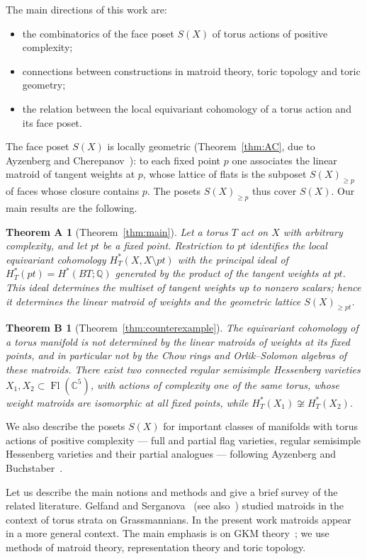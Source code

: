 \documentclass[11pt,a4paper]{article}
\numberwithin{equation}{section}
\theoremstyle{plain}
\newtheorem*{theoremA}{Theorem A}
\newtheorem*{theoremB}{Theorem B}
\theoremstyle{definition}
\theoremstyle{remark}
\newcommand{\Q}{\mathbb{Q}}
\newcommand{\C}{\mathbb{C}}
\newcommand{\HT}{H^{*}_{T}}
\DeclareMathOperator{\Fl}{Fl}
\begin{document}
The main directions of this work are:
\begin{itemize}[nosep]
\item the combinatorics of the face poset $S(X)$ of torus actions of positive complexity;
\item connections between constructions in matroid theory, toric topology and toric geometry;
\item the relation between the local equivariant cohomology of a torus action and its face poset.
\end{itemize}

The face poset $S(X)$ is locally geometric (Theorem~\ref{thm:AC}, due to Ayzenberg and Cherepanov~\cite{AC22}): to each fixed point $p$ one associates the linear matroid of tangent weights at $p$, whose lattice of flats is the subposet $S(X)_{\geqslant p}$ of faces whose closure contains $p$. The posets $S(X)_{\geqslant p}$ thus cover $S(X)$. Our main results are the following.

\begin{theoremA}[Theorem~\ref{thm:main}]
Let a torus $T$ act on $X$ with arbitrary complexity, and let $pt$ be a fixed point. Restriction to $pt$ identifies the local equivariant cohomology $\HT(X,X\setminus pt)$ with the principal ideal of $\HT(pt)=H^*(BT;\Q)$ generated by the product of the tangent weights at $pt$. This ideal determines the multiset of tangent weights up to nonzero scalars; hence it determines the linear matroid of weights and the geometric lattice $S(X)_{\geqslant pt}$.
\end{theoremA}

\begin{theoremB}[Theorem~\ref{thm:counterexample}]
The equivariant cohomology of a torus manifold is not determined by the linear matroids of weights at its fixed points, and in particular not by the Chow rings and Orlik--Solomon algebras of these matroids. There exist two connected regular semisimple Hessenberg varieties $X_1,X_2\subset\Fl(\C^5)$, with actions of complexity one of the same torus, whose weight matroids are isomorphic at all fixed points, while $\HT(X_1)\not\cong\HT(X_2)$.
\end{theoremB}

We also describe the posets $S(X)$ for important classes of manifolds with torus actions of positive complexity --- full and partial flag varieties, regular semisimple Hessenberg varieties and their partial analogues --- following Ayzenberg and Buchstaber~\cite{AB21,AB24}.

Let us describe the main notions and methods and give a brief survey of the related literature. Gelfand and Serganova~\cite{GS87} (see also~\cite{GGMS87}) studied matroids in the context of torus strata on Grassmannians. In the present work matroids appear in a more general context. The main emphasis is on GKM theory~\cite{GKM98}; we use methods of matroid theory, representation theory and toric topology.
\end{document}
